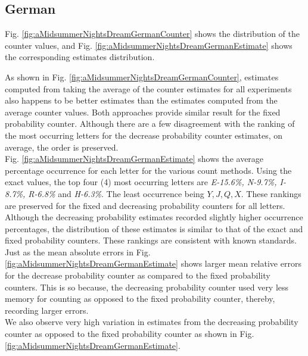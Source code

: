 \documentclass[longpaper, english, final, times]{revdetua}
\begin{document}
		\subsection{German}
			Fig. \ref{fig:aMidsummerNightsDreamGermanCounter} shows the distribution of the counter values, and Fig. \ref{fig:aMidsummerNightsDreamGermanEstimate} shows the corresponding estimates distribution. 
			
			As shown in Fig.  \ref{fig:aMidsummerNightsDreamGermanCounter}, estimates computed from taking the average of the counter estimates for all experiments also happens to be better estimates than the estimates computed from the average counter values. Both approaches provide similar result for the fixed probability counter. 
			Although there are a few disagreement with the ranking of the most occurring letters for the decrease probability counter estimates, on average, the order is preserved.\\
			
			Fig. \ref{fig:aMidsummerNightsDreamGermanEstimate} shows the average percentage occurrence for each letter for the various count methods. Using the exact values, the top four (4) most occurring letters are \textit{E-15.6\%, N-9.7\%, I-8.7\%, R-6.8\%} and \textit{H-6.3\%}. The least occurrence being $Y, J, Q, X$. These rankings are preserved for the fixed and decreasing probability counters for all letters. Although the decreasing probability estimates recorded slightly higher occurrence percentages, the distribution of these estimates is similar to that of the exact and fixed probability counters. These rankings are consistent with known standards.\\
			
			Just as the mean absolute errors in Fig.  \ref{fig:aMidsummerNightsDreamGermanEstimate} shows larger mean relative errors for the decrease probability counter as compared to the fixed probability counters. This is so because, the decreasing probability counter used very less memory for counting as opposed to the fixed probability counter, thereby, recording larger errors. \\
			
			We also observe very high variation in estimates from the decreasing probability counter as opposed to the fixed probability counter as shown in Fig. \ref{fig:aMidsummerNightsDreamGermanEstimate}.
			
\end{document}
